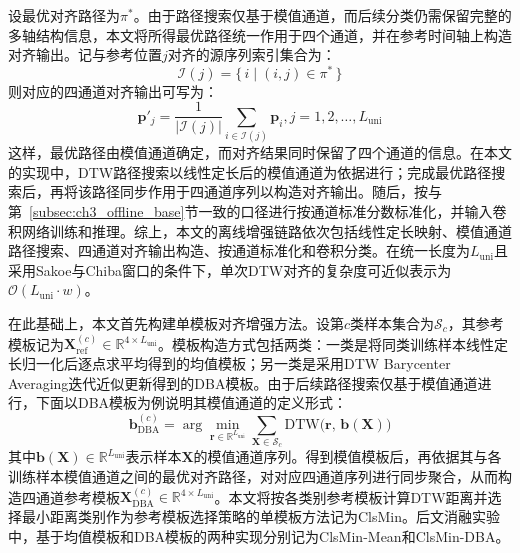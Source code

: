\documentclass{xdupgthesis}
\begin{document}
设最优对齐路径为$\pi^\ast$。由于路径搜索仅基于模值通道，而后续分类仍需保留完整的多轴结构信息，本文将所得最优路径统一作用于四个通道，并在参考时间轴上构造对齐输出。记与参考位置$j$对齐的源序列索引集合为：
\begin{equation}
    \mathcal{I}(j)=\{\,i\mid (i,j)\in\pi^\ast\,\}
\end{equation}
则对应的四通道对齐输出可写为：
\begin{equation}
    \mathbf{p}'_j=\frac{1}{|\mathcal{I}(j)|}\sum_{i\in\mathcal{I}(j)}\mathbf{p}_i, j=1,2,\ldots,L_{\mathrm{uni}}
\end{equation}
这样，最优路径由模值通道确定，而对齐结果同时保留了四个通道的信息。在本文的实现中，DTW路径搜索以线性定长后的模值通道为依据进行；完成最优路径搜索后，再将该路径同步作用于四通道序列以构造对齐输出。随后，按与第~\ref{subsec:ch3_offline_base}节一致的口径进行按通道标准分数标准化，并输入卷积网络训练和推理。综上，本文的离线增强链路依次包括线性定长映射、模值通道路径搜索、四通道对齐输出构造、按通道标准化和卷积分类。在统一长度为$L_{\mathrm{uni}}$且采用Sakoe与Chiba窗口的条件下，单次DTW对齐的复杂度可近似表示为$\mathcal{O}(L_{\mathrm{uni}}\cdot w)$。

在此基础上，本文首先构建单模板对齐增强方法。设第$c$类样本集合为$\mathcal{S}_c$，其参考模板记为$\mathbf{X}_{\mathrm{ref}}^{(c)}\in\mathbb{R}^{4\times L_{\mathrm{uni}}}$。模板构造方式包括两类：一类是将同类训练样本线性定长归一化后逐点求平均得到的均值模板；另一类是采用DTW Barycenter Averaging迭代近似更新得到的DBA模板\cite{ch3_petitjean2011dba}。由于后续路径搜索仅基于模值通道进行，下面以DBA模板为例说明其模值通道的定义形式：
\begin{equation}
    \mathbf{b}_{\mathrm{DBA}}^{(c)}
    =
    \arg\min_{\mathbf{r}\in\mathbb{R}^{L_{\mathrm{uni}}}}
    \sum_{\mathbf{X}\in\mathcal{S}_c}
    \mathrm{DTW}\big(\mathbf{r},\,\mathbf{b}(\mathbf{X})\big)
\end{equation}
其中$\mathbf{b}(\mathbf{X})\in\mathbb{R}^{L_{\mathrm{uni}}}$表示样本$\mathbf{X}$的模值通道序列。得到模值模板后，再依据其与各训练样本模值通道之间的最优对齐路径，对对应四通道序列进行同步聚合，从而构造四通道参考模板$\mathbf{X}_{\mathrm{DBA}}^{(c)}\in\mathbb{R}^{4\times L_{\mathrm{uni}}}$。本文将按各类别参考模板计算DTW距离并选择最小距离类别作为参考模板选择策略的单模板方法记为ClsMin。后文消融实验中，基于均值模板和DBA模板的两种实现分别记为ClsMin-Mean和ClsMin-DBA。
\end{document}
